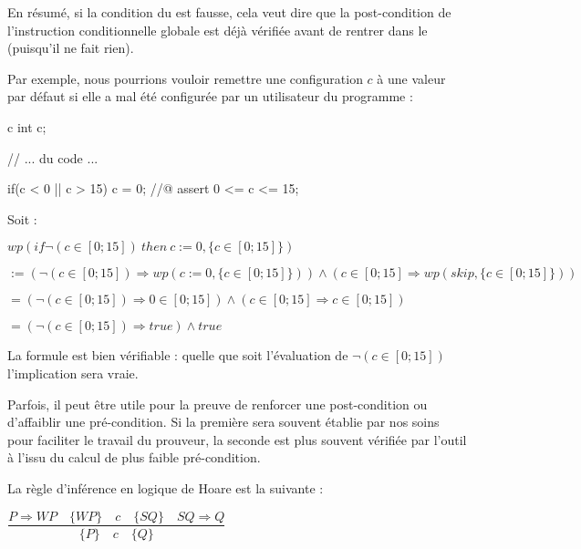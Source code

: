 \documentclass[middle]{zmdocument}
\begin{document}
En résumé, si la condition du  est fausse, cela veut dire que la 
post-condition de l'instruction conditionnelle globale est déjà vérifiée avant de 
rentrer dans le  (puisqu'il ne fait rien).



Par exemple, nous pourrions vouloir remettre une configuration $c$ à une valeur 
par défaut si elle a mal été configurée par un utilisateur du programme :



\begin{CodeBlock}{c}
int c;

// ... du code ...

if(c < 0 || c > 15){
  c = 0;
}
//@ assert 0 <= c <= 15;
\end{CodeBlock}



Soit :



$wp(if \neg (c \in [0;15])\ then\ c := 0, \{c \in [0;15]\})$



$:= (\neg (c \in [0;15])\Rightarrow wp(c := 0, \{c \in [0;15]\})) \wedge (c \in [0;15]\Rightarrow wp(skip, \{c \in [0;15]\}))$



$= (\neg (c \in [0;15]) \Rightarrow 0 \in [0;15]) \wedge (c \in [0;15] \Rightarrow c \in [0;15])$



$= (\neg (c \in [0;15]) \Rightarrow true) \wedge true$



La formule est bien vérifiable : quelle que soit l'évaluation de $\neg (c \in [0;15])$ l'implication sera vraie.







Parfois, il peut être utile pour la preuve de renforcer une post-condition ou 
d'affaiblir une pré-condition. Si la première sera souvent établie par nos soins
pour faciliter le travail du prouveur, la seconde est plus souvent vérifiée 
par l'outil à l'issu du calcul de plus faible pré-condition.



La règle d'inférence en logique de Hoare est la suivante :




\begin{center}
$\dfrac{P \Rightarrow WP \quad \{WP\}\quad c\quad \{SQ\} \quad SQ \Rightarrow Q}{\{P\}\quad c \quad \{Q\}}$


\end{center}
\end{document}
